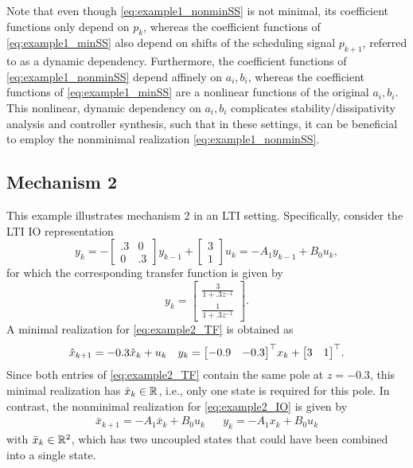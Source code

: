 \begin{remark}
    Note that even though \eqref{eq:example1_nonminSS} is not minimal, its coefficient functions only depend on $p_k$, whereas the coefficient functions of \eqref{eq:example1_minSS} also depend on shifts of the scheduling signal $p_{k+1}$, referred to as a dynamic dependency. Furthermore, the coefficient functions of \eqref{eq:example1_nonminSS} depend affinely on $a_i,b_i$, whereas the coefficient functions of \eqref{eq:example1_minSS} are a nonlinear functions of the original $a_i,b_i$. This nonlinear, dynamic dependency on $a_i,b_i$ complicates stability/dissipativity analysis and controller synthesis, such that in these settings, it can be beneficial to employ the nonminimal realization \eqref{eq:example1_nonminSS}.
\end{remark}

\subsection{Mechanism 2}
This example illustrates mechanism 2 in an LTI setting. Specifically, consider the LTI IO representation
\begin{equation}\label{eq:example2_IO}
    y_k = -\begin{bmatrix} .3 & 0 \\ 0 & .3 \end{bmatrix} y_{k-1}  + \begin{bmatrix} 3 \\ 1 \end{bmatrix} u_k = -A_1 y_{k-1} + B_0 u_k,
\end{equation}
for which the corresponding transfer function is given by
\begin{equation}\label{eq:example2_TF}
    y_k = \begin{bmatrix}
        \frac{3}{1 + .3 z^{-1}} \\
        \frac{1}{1 + .3 z^{-1}} 
    \end{bmatrix}.
\end{equation}
A minimal realization for \eqref{eq:example2_TF} is obtained as
\begin{align}\label{eq:example2_minSS}
    \hat{x}_{k+1} = -0.3 \hat{x}_{k} + u_k & & y_k = \begin{bmatrix} -0.9 & -0.3 \end{bmatrix}^\top\! x_k + \begin{bmatrix} 3 & 1 \end{bmatrix}^\top\!.
\end{align}
Since both entries of \eqref{eq:example2_TF} contain the same pole at $z = -0.3$, this minimal realization has $\hat{x}_k \in \mathbb{R}$, i.e., only one state is required for this pole. In contrast, the nonminimal realization for \eqref{eq:example2_IO} is given by
\begin{align}\label{eq:example2_nonminSS}
    \bar{x}_{k+1} = -A_1 \bar{x}_k + B_0 u_k & & y_k = -A_1 x_k + B_0 u_k
\end{align}
with $\bar{x}_k \in \mathbb{R}^2$, which has two uncoupled states that could have been combined into a single state.

